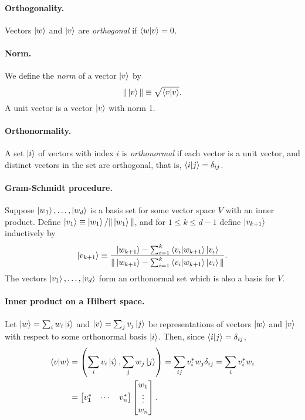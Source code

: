 \documentclass{article}
\numberwithin{theorem}{section}
\numberwithin{corollary}{section}
\numberwithin{postulate}{section}
\begin{document}
\paragraph{Orthogonality.} Vectors $\ket{w}$ and $\ket{v}$ are
\emph{orthogonal} if $\ip{w}{v} = 0$.

\paragraph{Norm.} We define the \emph{norm} of a vector $\ket{v}$ by \[
  \|\ket{v}\| \equiv \sqrt{\ip{v}}.
\] A unit vector is a vector $\ket{v}$ with norm 1.

\paragraph{Orthonormality.} A set $\ket{i}$ of vectors with index $i$ is
\emph{orthonormal} if each vector is a unit vector, and distinct vectors in the
set are orthogonal, that is, $\ip{i}{j} = \delta_{ij}$.

\paragraph{Gram-Schmidt procedure.} Suppose $\ket{w_1}, \ldots, \ket{w_d}$ is a
basis set for some vector space $V$ with an inner product. Define $\ket{v_1}
\equiv \ket{w_1}/\|\ket{w_1}\|$, and for $1 \leq k \leq d - 1$ define
$\ket{v_{k+1}}$ inductively by \[
  \ket{v_{k+1}} \equiv \frac{
    \ket{w_{k+1}} - \sum_{i=1}^k \ip{v_i}{w_{k+1}}\ket{v_i}
  }{
    \|\ket{w_{k+1}} - \sum_{i=1}^k \ip{v_i}{w_{k+1}}\ket{v_i}\|
  }.
\] The vectors $\ket{v_1}, \ldots, \ket{v_d}$ form an orthonormal set which is
also a basis for $V$.

\paragraph{Inner product on a Hilbert space.} Let $\ket{w} = \sum_i w_i\ket{i}$
and $\ket{v} = \sum_j v_j\ket{j}$ be representations of vectors $\ket{w}$ and
$\ket{v}$ with respect to some orthonormal basis $\ket{i}$. Then, since
$\ip{i}{j} = \delta_{ij}$,
\begin{align*}
  \ip{v}{w}
  &= \left(\sum_i v_i\ket{i}, \sum_j w_j\ket{j}\right)
  = \sum_{ij} v_i^*w_j\delta_{ij}
  = \sum_i v_i^*w_i \\
  &=
  \begin{bmatrix}
    v_1^* & \cdots & v_n^*
  \end{bmatrix}
  \begin{bmatrix}
    w_1 \\
    \vdots \\
    w_n
  \end{bmatrix}.
\end{align*}
\end{document}
